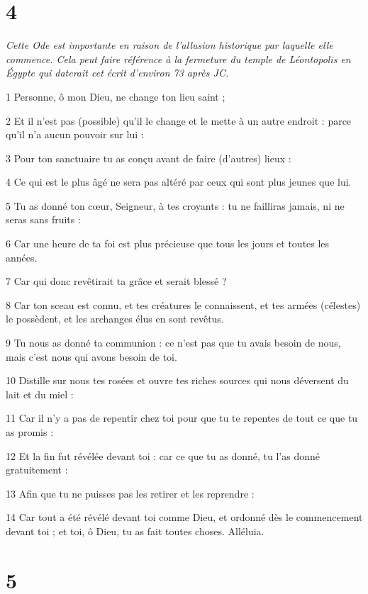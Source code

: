 \chapter{4}

\par \textit{Cette Ode est importante en raison de l'allusion historique par laquelle elle commence. Cela peut faire référence à la fermeture du temple de Léontopolis en Égypte qui daterait cet écrit d'environ 73 après JC.}

\par 1 Personne, ô mon Dieu, ne change ton lieu saint ;
\par 2 Et il n'est pas (possible) qu'il le change et le mette à un autre endroit : parce qu'il n'a aucun pouvoir sur lui :
\par 3 Pour ton sanctuaire tu as conçu avant de faire (d'autres) lieux :
\par 4 Ce qui est le plus âgé ne sera pas altéré par ceux qui sont plus jeunes que lui.
\par 5 Tu as donné ton cœur, Seigneur, à tes croyants : tu ne failliras jamais, ni ne seras sans fruits :
\par 6 Car une heure de ta foi est plus précieuse que tous les jours et toutes les années.
\par 7 Car qui donc revêtirait ta grâce et serait blessé ?
\par 8 Car ton sceau est connu, et tes créatures le connaissent, et tes armées (célestes) le possèdent, et les archanges élus en sont revêtus.
\par 9 Tu nous as donné ta communion : ce n'est pas que tu avais besoin de nous, mais c'est nous qui avons besoin de toi.
\par 10 Distille sur nous tes rosées et ouvre tes riches sources qui nous déversent du lait et du miel :
\par 11 Car il n'y a pas de repentir chez toi pour que tu te repentes de tout ce que tu as promis :
\par 12 Et la fin fut révélée devant toi : car ce que tu as donné, tu l'as donné gratuitement :
\par 13 Afin que tu ne puisses pas les retirer et les reprendre :
\par 14 Car tout a été révélé devant toi comme Dieu, et ordonné dès le commencement devant toi ; et toi, ô Dieu, tu as fait toutes choses. Alléluia.

\chapter{5}

